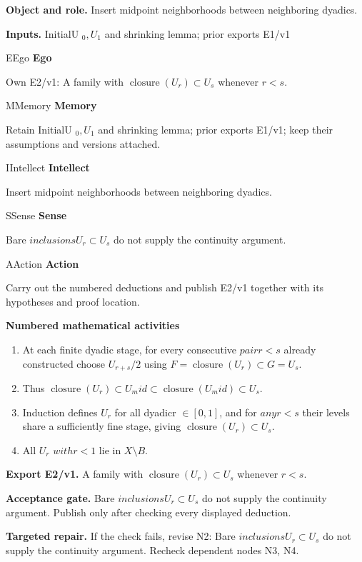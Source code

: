 \documentclass[preprint,12pt,aps,pra,showkeys,amsmath,amssymb,superscriptaddress,floatfix]{revtex4-2}
\theoremstyle{definition}
\theoremstyle{remark}
\newcommand{\mmfaculty}[3]{%
 \begin{mmfacultybox}{#1}{#2}
 {\sffamily\bfseries\color{MMBlue}#2}\par\smallskip #3
 \end{mmfacultybox}}
\newcommand{\field}[2]{\par\smallskip\noindent\textbf{#1.} #2\par}
\begin{document}
\field{Object and role}{Insert midpoint neighborhoods between neighboring dyadics.}

\field{Inputs}{InitialU \(_{0},U_{1}\) and shrinking lemma; prior exports E1/v1}

\mmfaculty{E}{Ego}{Own E2/v1: A family with \(\operatorname{closure} (U_r)\subset U_s\)
whenever \(r<s\).}

\mmfaculty{M}{Memory}{Retain InitialU \(_{0},U_{1}\) and shrinking lemma; prior exports E1/v1;
keep their assumptions and versions attached.}

\mmfaculty{I}{Intellect}{Insert midpoint neighborhoods between neighboring dyadics.}

\mmfaculty{S}{Sense}{Bare \(inclusionsU_r\subset U_s\) do not supply the continuity argument.}

\mmfaculty{A}{Action}{Carry out the numbered deductions and publish E2/v1 together with its
hypotheses and proof location.}

\smallskip\noindent\textbf{Numbered mathematical activities}

\begin{enumerate}[label=N2.\arabic*,leftmargin=3.4em]

\item At each finite dyadic stage, for every consecutive \(pairr<s\) already
constructed choose \(U_{r+s}/2\) using
\(F=\operatorname{closure} (U_r)\subset G=U_s\).

\item Thus
\(\operatorname{closure} (U_r)\subset U_mid\subset \operatorname{closure} (U_mid)\subset U_s\).

\item Induction defines \(U_r\) for all dyadicr \(\in [0,1]\), and for
\(anyr<s\) their levels share a sufficiently fine stage, giving
\(\operatorname{closure} (U_r)\subset U_s\).

\item All \(U_r\) \(withr<1\) lie in \(X\setminus B\).

\end{enumerate}

\field{Export E2/v1}{A family with \(\operatorname{closure} (U_r)\subset U_s\) whenever
\(r<s\).}

\field{Acceptance gate}{Bare \(inclusionsU_r\subset U_s\) do not supply the continuity argument.
Publish only after checking every displayed deduction.}

\field{Targeted repair}{If the check fails, revise N2: Bare \(inclusionsU_r\subset U_s\) do not
supply the continuity argument. Recheck dependent nodes N3, N4.}
\end{document}
